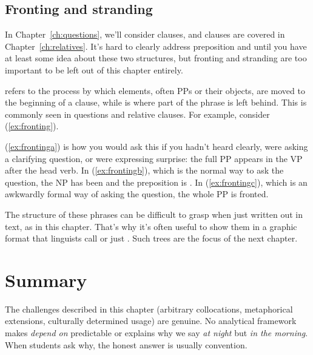 \subsection{Fronting and stranding} \label{sec:preposition-stranding}

In Chapter~\ref{ch:questions}, we'll consider  clauses, and  clauses are covered in Chapter~\ref{ch:relatives}. It's hard to clearly address preposition  and  until you have at least some idea about these two structures, but fronting and stranding are too important to be left out of this chapter entirely.

 refers to the process by which elements, often PPs or their objects, are moved to the beginning of a clause, while  is where part of the phrase is left behind. This is commonly seen in questions and relative clauses. For example, consider (\ref{ex:fronting}).

\ea \label{ex:fronting}
    \label{ex:frontinga}
    \label{ex:frontingb}
    \label{ex:frontingc}
    \z
\z
(\ref{ex:frontinga}) is how you would ask this if you hadn't heard clearly, were asking a clarifying question, or were expressing surprise: the full  PP appears in the VP after the head verb. In (\ref{ex:frontingb}), which is the normal way to ask the question, the NP  has been  and the preposition  is . In (\ref{ex:frontingc}), which is an awkwardly formal way of asking the question, the whole PP is fronted.

The structure of these phrases can be difficult to grasp when just written out in text, as in this chapter. That's why it's often useful to show them in a graphic format that linguists call  or just . Such trees are the focus of the next chapter.

\section{Summary}

The challenges described in this chapter (arbitrary collocations, metaphorical extensions, culturally determined usage) are genuine. No analytical framework makes \emph{depend on} predictable or explains why we say \emph{at night} but \emph{in the morning}. When students ask why, the honest answer is usually convention.

